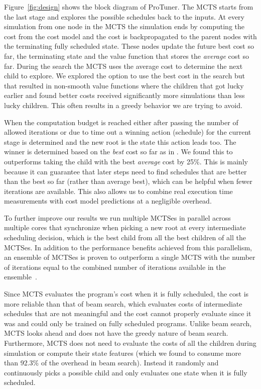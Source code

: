 Figure~\ref{fig:design} shows the block diagram of ProTuner. The MCTS starts from the last stage and explores the possible schedules back to the inputs. At every simulation from one node in the MCTS the simulation ends by computing the cost from the cost model and the cost is backpropagated to the parent nodes with the terminating fully scheduled state. These nodes update the future best cost so far, the terminating state and the value function that stores the \emph{average} cost so far. During the search the MCTS uses the average cost to determine the next child to explore. We explored the option to use the best cost in the search but that resulted in non-smooth value functions where the children that got lucky earlier and found better costs received significantly more simulations than less lucky children. This often results in a greedy behavior we are trying to avoid. 

When the computation budget is reached either after passing the number of allowed iterations or due to time out a winning action (schedule) for the current stage is determined and the new root is the state this action leads too. The winner is determined based on the \emph{best} cost so far as in \cite{bjornsson2009cadiaplayer}. We found this to outperforms taking the child with the best \emph{average} cost by 25\%. This is mainly because it can guarantee that later steps need to find schedules that are better than the best so far (rather than average best), which can be helpful when fewer iterations are available. This also allows us to combine real execution time measurements with cost model predictions at a negligible overhead.

To further improve our results we run multiple MCTSes in parallel across multiple cores that synchronize when picking a new root at every intermediate scheduling decision, which is the best child from all the best children of all the MCTSes. In addition to the performance benefits achieved from this parallelism, an ensemble of MCTSes is proven to outperform a single MCTS with the number of iterations equal to the combined number of iterations available in the ensemble~\cite{chaslot2008parallel}.

Since MCTS evaluates the program's cost when it is fully scheduled, the cost is more reliable than that of beam search, which evaluates costs of intermediate schedules that are not meaningful and the cost cannot properly evaluate since it was and could only be trained on fully scheduled programs. Unlike beam search, MCTS looks ahead and does not have the greedy nature of beam search. Furthermore, MCTS does not need to evaluate the costs of all the children during simulation or compute their state features (which we found to consume more than 92.3\% of the overhead in beam search). Instead it randomly and continuously picks a possible child and only evaluates one state when it is fully scheduled. 




